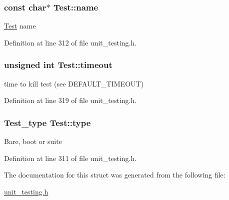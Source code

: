 \hypertarget{structTest_ae44674e48b203d9c26e04e09b6fe5b61}{
\subsubsection[{name}]{\setlength{\rightskip}{0pt plus 5cm}const char$\ast$ Test\-::name}}\label{structTest_ae44674e48b203d9c26e04e09b6fe5b61}
\hyperlink{structTest}{Test} name 

Definition at line 312 of file unit\-\_\-testing.\-h.

\hypertarget{structTest_a80e78f2e6aeed2a6e5b7c705ce5a1493}{
\subsubsection[{timeout}]{\setlength{\rightskip}{0pt plus 5cm}unsigned int Test\-::timeout}}\label{structTest_a80e78f2e6aeed2a6e5b7c705ce5a1493}
time to kill test (see D\-E\-F\-A\-U\-L\-T\-\_\-\-T\-I\-M\-E\-O\-U\-T) 

Definition at line 319 of file unit\-\_\-testing.\-h.

\hypertarget{structTest_a5074007b777ea0958966027197c17792}{
\subsubsection[{type}]{\setlength{\rightskip}{0pt plus 5cm}Test\-\_\-type Test\-::type}}\label{structTest_a5074007b777ea0958966027197c17792}
Bare, boot or suite 

Definition at line 311 of file unit\-\_\-testing.\-h.



The documentation for this struct was generated from the following file\-:\begin{DoxyCompactItemize}
\item 
\hyperlink{unit__testing_8h}{unit\-\_\-testing.\-h}\end{DoxyCompactItemize}
